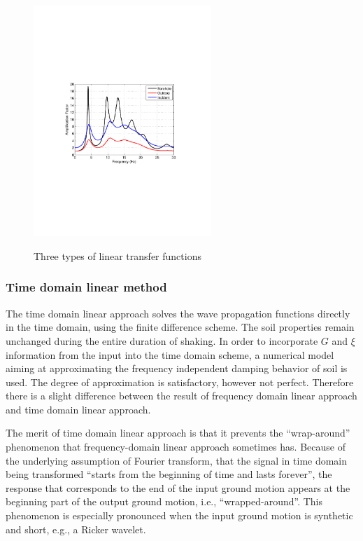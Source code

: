 \documentclass[11pt,letterpaper]{article}
\begin{document}
\begin{figure}[h]
    \centering
  \includegraphics[width=0.6\textwidth]{three_types_of_TF.pdf}\\
  \caption{Three types of linear transfer functions}\label{fig:three-types-of-TF}
\end{figure}




\subsubsection{Time domain linear method}

The time domain linear approach solves the wave propagation functions directly in the time domain, using the finite difference scheme. The soil properties remain unchanged during the entire duration of shaking. In order to incorporate $G$ and $\xi$ information from the input into the time domain scheme, a numerical model aiming at approximating the frequency independent damping behavior of soil is used. The degree of approximation is satisfactory, however not perfect. Therefore there is a slight difference between the result of frequency domain linear approach and time domain linear approach.

The merit of time domain linear approach is that it prevents the ``wrap-around'' phenomenon that frequency-domain linear approach sometimes has. Because of the underlying assumption of Fourier transform, that the signal in time domain being transformed ``starts from the beginning of time and lasts forever'', the response that corresponds to the end of the input ground motion appears at the beginning part of the output ground motion, i.e., ``wrapped-around''.  This phenomenon is especially pronounced when the input ground motion is synthetic and short, e.g., a Ricker wavelet.
\end{document}
